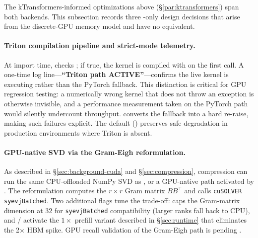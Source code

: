 The kTransformers-informed optimizations above (\S\ref{par:ktransformers}) span both backends.
This subsection records three \cuda{}-only design decisions that arise from the discrete-GPU
memory model and have no \mlxe{} equivalent.

\paragraph{Triton compilation pipeline and strict-mode telemetry.}
\label{par:triton-telemetry}
At import time,  checks ; if true, the kernel
is compiled with  on the first call. A one-time log line---\textbf{``Triton
path ACTIVE''}---confirms the live kernel is executing rather than the PyTorch fallback.
This distinction is critical for GPU regression testing: a numerically wrong kernel that does
not throw an exception is otherwise invisible, and a performance measurement taken on the
PyTorch path would silently undercount \cuda{} throughput. 
converts the  fallback into a hard re-raise, making such failures
explicit. The default () preserves safe degradation in production environments
where Triton is absent.

\paragraph{GPU-native SVD via the Gram-Eigh reformulation.}
\label{par:gram-eigh}
As described in \S\ref{sec:background-cuda} and \S\ref{sec:compression}, \cuda{} compression
can run the same CPU-offloaded NumPy SVD as \mlxe{}, or a GPU-native path activated by
. The reformulation computes the $r{\times}r$ Gram matrix
$B B^\top$ and calls \texttt{cuSOLVER} \texttt{syevjBatched}. Two additional flags tune the
trade-off:  caps the Gram-matrix dimension at $32$ for
\texttt{syevjBatched} compatibility (larger ranks fall back to CPU), and
 /  activate the $1{\times}$
prefill variant described in \S\ref{sec:runtime} that eliminates the 2$\times$ HBM spike.
GPU recall validation of the Gram-Eigh path is pending \pendingGPU{}.

